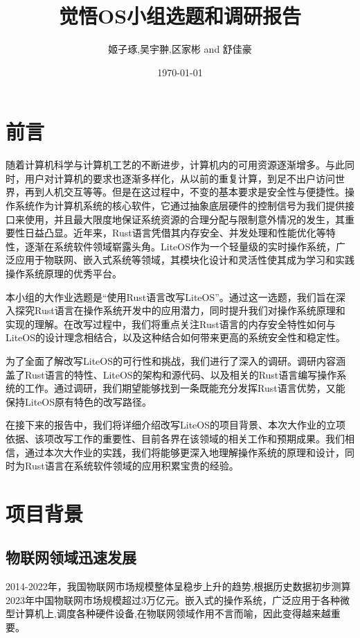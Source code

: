 \documentclass{ctexart}
\title{觉悟OS小组选题和调研报告}
\author{姬子琢,吴宇翀,区家彬 and 舒佳豪}
\date{\today}
\begin{document}
\maketitle

\section{前言}
随着计算机科学与计算机工艺的不断进步，计算机内的可用资源逐渐增多。与此同时，用户对计算机的要求也逐渐多样化，从以前的重复计算，到足不出户访问世界，再到人机交互等等。但是在这过程中，不变的基本要求是安全性与便捷性。操作系统作为计算机系统的核心软件，它通过抽象底层硬件的控制信号为我们提供接口来使用，并且最大限度地保证系统资源的合理分配与限制意外情况的发生，其重要性日益凸显。近年来，Rust语言凭借其内存安全、并发处理和性能优化等特性，逐渐在系统软件领域崭露头角。LiteOS作为一个轻量级的实时操作系统，广泛应用于物联网、嵌入式系统等领域，其模块化设计和灵活性使其成为学习和实践操作系统原理的优秀平台。

本小组的大作业选题是“使用Rust语言改写LiteOS”。通过这一选题，我们旨在深入探究Rust语言在操作系统开发中的应用潜力，同时提升我们对操作系统原理和实现的理解。在改写过程中，我们将重点关注Rust语言的内存安全特性如何与LiteOS的设计理念相结合，以及这种结合如何带来更高的系统安全性和稳定性。

为了全面了解改写LiteOS的可行性和挑战，我们进行了深入的调研。调研内容涵盖了Rust语言的特性、LiteOS的架构和源代码、以及相关的Rust语言编写操作系统的工作。通过调研，我们期望能够找到一条既能充分发挥Rust语言优势，又能保持LiteOS原有特色的改写路径。

在接下来的报告中，我们将详细介绍改写LiteOS的项目背景、本次大作业的立项依据、该项改写工作的重要性、目前各界在该领域的相关工作和预期成果。我们相信，通过本次大作业的实践，我们将能够更深入地理解操作系统的原理和设计，同时为Rust语言在系统软件领域的应用积累宝贵的经验。
\newpage
\tableofcontents
\newpage
\section{项目背景}
\subsection{物联网领域迅速发展}
2014-2022年，我国物联网市场规模整体呈稳步上升的趋势,根据历史数据初步测算2023年中国物联网市场规模超过3万亿元。嵌入式的操作系统，广泛应用于各种微型计算机上,调度各种硬件设备,在物联网领域作用不言而喻，因此变得越来越重要。
\end{document}
